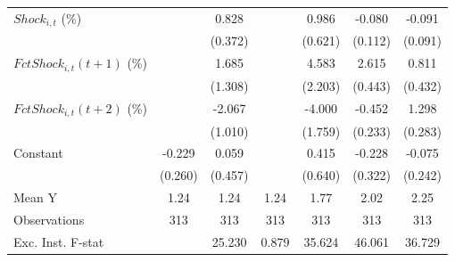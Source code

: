 {\begin{tabular}{l*{6}{c}}
\addlinespace
$ Shock_{i,t}$ (\%) &                     &       0.828\sym{**} &                     &       0.986         &      -0.080         &      -0.091         \\
                    &                     &     (0.372)         &                     &     (0.621)         &     (0.112)         &     (0.091)         \\
\addlinespace
$ FctShock_{i,t}(t+1)$ (\%)&                     &       1.685         &                     &       4.583\sym{*}  &       2.615\sym{***}&       0.811\sym{*}  \\
                    &                     &     (1.308)         &                     &     (2.203)         &     (0.443)         &     (0.432)         \\
\addlinespace
$ FctShock_{i,t}(t+2)$ (\%)&                     &      -2.067\sym{*}  &                     &      -4.000\sym{**} &      -0.452\sym{*}  &       1.298\sym{***}\\
                    &                     &     (1.010)         &                     &     (1.759)         &     (0.233)         &     (0.283)         \\
\addlinespace
Constant            &      -0.229         &       0.059         &                     &       0.415         &      -0.228         &      -0.075         \\
                    &     (0.260)         &     (0.457)         &                     &     (0.640)         &     (0.322)         &     (0.242)         \\
\midrule
Mean Y              &        1.24         &        1.24         &        1.24         &        1.77         &        2.02         &        2.25         \\
Observations        &         313         &         313         &         313         &         313         &         313         &         313         \\
Exc. Inst. F-stat   &                     &      25.230         &       0.879         &      35.624         &      46.061         &      36.729         \\
\bottomrule
\end{tabular}
}
